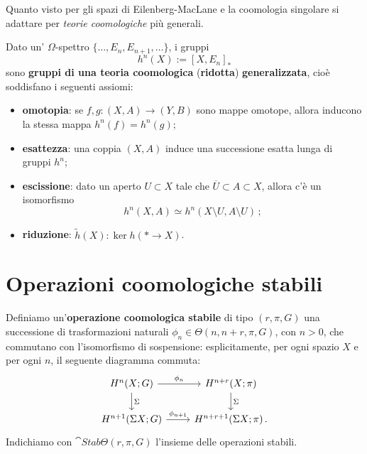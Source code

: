 Quanto visto per gli spazi di Eilenberg-MacLane e la coomologia singolare
si adattare per \emph{teorie coomologiche} più generali.

\begin{fact}
	Dato un' $\Omega$-spettro $\{\dots,E_{n}, E_{n+1}, \dots \}$, i gruppi 
	\begin{equation*}
		h^{n}(X) := [X,E_{n}]_{\ast}
	\end{equation*}
	sono \textbf{gruppi di una teoria coomologica} (\textbf{ridotta}) \textbf{generalizzata},
	cioè soddisfano i seguenti assiomi:
	\begin{itemize}
		\item \textbf{omotopia}: se $f,g:(X,A) \to (Y,B)$ sono mappe omotope, 
		allora inducono la stessa mappa $h^{n}(f) = h^{n}(g)$;
		
		\item \textbf{esattezza}: una coppia $(X,A)$ induce una successione esatta
		lunga di gruppi $h^{n}$;
		
		\item \textbf{escissione}: dato un aperto $U \subset X$ tale che 
		$\overline{U} \subset A \subset X$, allora c'è un isomorfismo
		\begin{equation*}
			h^{n}(X,A) \simeq h^{n}(X \setminus U, A \setminus U)\,;
		\end{equation*}
		
		\item \textbf{riduzione}: $\widetilde{h}(X) : \ker h(\ast \to X)$.
	\end{itemize}
\end{fact}


\section{Operazioni coomologiche stabili}

	\begin{df}
		Definiamo un'\textbf{operazione coomologica stabile} di tipo
		$(r,\pi,G)$ una successione di trasformazioni naturali 
		$\phi_{n} \in \Theta(n,n+r, \pi, G)$, con $n > 0$, che
		commutano con l'isomorfismo di sospensione:
		esplicitamente, per ogni spazio $X$ e per ogni $n$,
		il seguente diagramma commuta:
		\begin{equation*}
			\begin{tikzcd}
				H^{n}(X;G) \ar[r, "\phi_{n}"] \ar[d, "\Sigma"]
				& H^{n+r}(X;\pi) \ar[d, "\Sigma"] \\
				H^{n+1}(\Sigma X;G) \ar[r, "\phi_{n+1}"] 
				& H^{n+r+1}(\Sigma X;\pi) \,. 
			\end{tikzcd}
		\end{equation*}
		Indichiamo con $\cat{Stab}\Theta(r,\pi,G)$ l'insieme delle
		operazioni stabili.
	\end{df}
	
